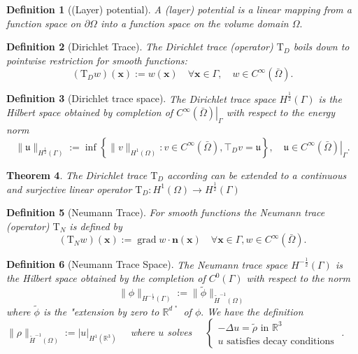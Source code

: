 \documentclass[10pt,journal,compsoc, onecolumn]{IEEEtran}
\newtheorem{theorem}{Theorem}[section]
\newtheorem{definition}[theorem]{Definition}
\begin{document}
\begin{definition}[(Layer) potential]
A (layer) potential is a linear mapping from a function space on \(\partial \Omega\) into a function space on the
volume domain \(\Omega .\)
\end{definition}


\begin{definition}[Dirichlet Trace]
The Dirichlet trace (operator) \(\mathrm{T}_{D}\) boils down to pointwise restriction for smooth functions:
$$
\left(\mathrm{T}_{D} w\right)(\boldsymbol{x}):=w(\boldsymbol{x}) \quad \forall \boldsymbol{x} \in \Gamma, \quad w \in C^{\infty}(\bar{\Omega}).
$$
\end{definition}
\begin{definition}[Dirichlet trace space]
The Dirichlet trace space \(H^{\frac{1}{2}}(\Gamma)\) is the Hilbert space obtained by completion of \(\left.C^{\infty}(\bar{\Omega})\right|_{\Gamma}\) with
respect to the energy norm 
$$\|\mathfrak{u}\|_{H^{\frac{1}{2}}(\Gamma)}:=\inf \left\{\|v\|_{H^{1}(\Omega)}: v \in C^{\infty}(\bar{\Omega}), \top_{D} v=\mathfrak{u}\right\},\left.\quad \mathfrak{u} \in C^{\infty}(\bar{\Omega})\right|_{\Gamma}.$$
\end{definition}

\begin{theorem}
The Dirichlet trace \(\mathrm{T}_{D}\) according can be extended to a continuous and surjective linear
operator \(\mathrm{T}_{D}: H^{1}(\Omega) \rightarrow H^{\frac{1}{2}}(\Gamma)\)
\end{theorem}

\begin{definition}[Neumann Trace]
For smooth functions the Neumann trace (operator) \(\mathrm{T}_{N}\) is defined by
$$
\left(\mathrm{T}_{N} w\right)(\boldsymbol{x}):=\operatorname{grad} w \cdot \boldsymbol{n}(\boldsymbol{x}) \quad \forall \boldsymbol{x} \in \Gamma, w \in C^{\infty}(\bar{\Omega}).
$$
\end{definition}

\begin{definition}[Neumann Trace Space]
The Neumann trace space \(H^{-\frac{1}{2}}(\Gamma)\) is the Hilbert space obtained by the completion of \(C^{0}(\Gamma)\) with respect to the norm $$\|\phi\|_{H^{-\frac{1}{2}}(\Gamma)}:=\|\widetilde{\phi}\|_{\widetilde{H}^{-1}(\Omega)}$$ where  \(\widetilde{\phi}\) is the
"extension by zero to \(\mathbb{R}^{d \text { " }}\) of \(\phi .\)
We have the definition \(\|\rho\|_{\widetilde{H}^{-1}(\Omega)}:=|u|_{H^{1}\left(\mathbb{R}^{3}\right)} \quad\) where \(u\) solves \(\quad\left\{\begin{array}{c}-\Delta u=\widetilde{\rho} \text { in } \mathbb{R}^{3} \\ u \text { satisfies decay conditions }\end{array}\right.\). 
\end{definition}
\end{document}
